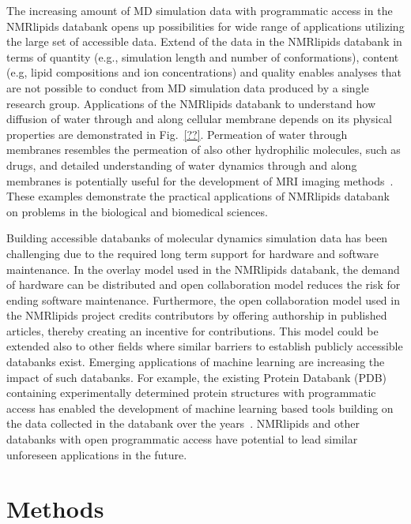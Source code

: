 \documentclass[fleqn,10pt]{wlscirep}
\begin{document}
The increasing amount of MD simulation data with programmatic access in the NMRlipids databank opens up possibilities for wide range of applications utilizing the large set of accessible data. Extend of the data in the NMRlipids databank in terms of quantity (e.g., simulation length and number of conformations), content (e.g, lipid compositions and ion concentrations) and quality enables analyses that are not possible to conduct from MD simulation data produced by a single research group. Applications of the NMRlipids databank to understand how diffusion of water through and along cellular membrane depends on its physical properties are demonstrated in Fig.~\ref{??}. Permeation of water through membranes resembles the permeation of also other hydrophilic molecules, such as drugs, and detailed understanding of water dynamics through and along membranes is potentially useful for the development of MRI imaging methods~\cite{topgaard20}. 
These examples demonstrate the practical applications of NMRlipids databank on problems in the biological and biomedical sciences.

Building accessible databanks of molecular dynamics simulation data has been challenging due to the required long term support for hardware and software maintenance. In the overlay model used in the NMRlipids databank, the demand of hardware can be distributed and open collaboration model reduces the risk for ending software maintenance. Furthermore, the open collaboration model used in the NMRlipids project credits contributors by offering authorship in published articles, thereby creating an incentive for contributions. This model could be extended also to other fields where similar barriers to establish publicly accessible databanks exist. Emerging applications of machine learning are increasing the impact of such databanks. For example, the existing Protein Databank (PDB)~\cite{??} containing experimentally determined protein structures with programmatic access has enabled the development of machine learning based tools building on the data collected in the databank over the years~\cite{??}. NMRlipids and other databanks with open programmatic access have potential to lead similar unforeseen applications in the future.


\section{Methods}

\end{document}
